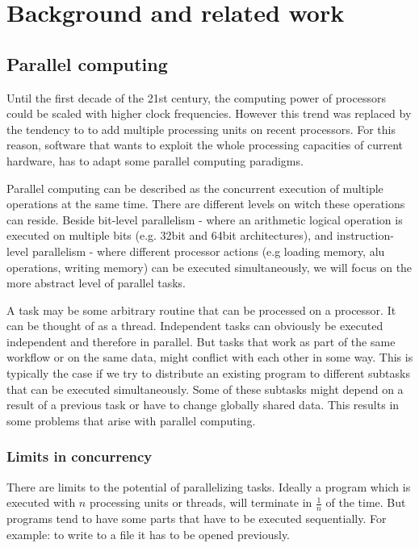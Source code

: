 \chapter{Background and related work}

\section{Parallel computing}
Until the first decade of the 21st century, the computing power of processors could be scaled with higher clock frequencies. However this trend was replaced by the tendency to to add multiple processing units on recent processors. For this reason, software that wants to exploit the whole processing capacities of current hardware, has to adapt some parallel computing paradigms.

Parallel computing can be described as the concurrent execution of multiple operations at the same time. There are different levels on witch these operations can reside. Beside bit-level parallelism - where an arithmetic logical operation is executed on multiple bits (e.g. 32bit and 64bit architectures), and instruction-level parallelism\cite{wall1991limits} - where different processor actions (e.g loading memory, alu operations, writing memory) can be executed simultaneously, we will focus on the more abstract level of parallel tasks.

A task may be some arbitrary routine that can be processed on a processor. It can be thought of as a thread. Independent tasks can obviously be executed independent and therefore in parallel. But tasks that work as part of the same workflow or on the same data, might conflict with each other in some way. This is typically the case if we try to distribute an existing program to different subtasks that can be executed simultaneously. Some of these subtasks might depend on a result of a previous task or have to change globally shared data. This results in some problems that arise with parallel computing.

\subsection{Limits in concurrency}
There are limits to the potential of parallelizing tasks. Ideally a program which is executed with $n$ processing units or threads, will terminate in $\frac{1}{n}$ of the time. But programs tend to have some parts that have to be executed sequentially. For example: to write to a file it has to be opened previously.

